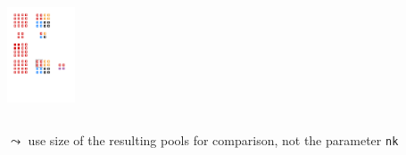 \documentclass[aspectratio=169]{beamer}
\begin{document}
\begin{frame}
\begin{columns}
\begin{column}{0.5\textwidth}
			\pause[3]\begin{center}
				\includegraphics[width=0.15\textwidth]{figs/np4_nk_4.pdf}			
			\end{center}
		\end{column}
	\end{columns}
	
	\vspace{8pt}

	\pause

	\(\leadsto\) use size of the resulting pools for comparison, not the parameter \texttt{nk}

\end{frame}
\end{document}
